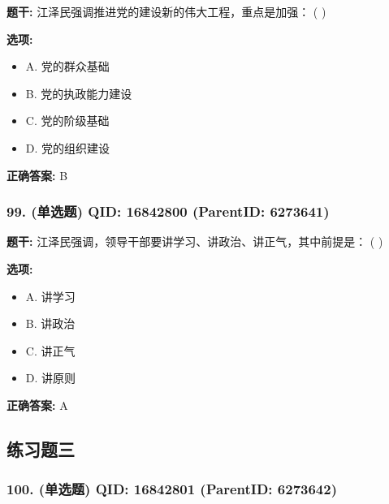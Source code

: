 \documentclass[12pt,UTF8]{ctexart}
\begin{document}
\textbf{题干:}
江泽民强调推进党的建设新的伟大工程，重点是加强： ( )



\textbf{选项:}
\begin{itemize}[leftmargin=*]

  \item A. 党的群众基础

  \item B. 党的执政能力建设

  \item C. 党的阶级基础

  \item D. 党的组织建设

\end{itemize}

\textbf{正确答案:}
B

\vspace{0.3em}\hrulefill\vspace{0.7em}

\subsubsection*{99. (单选题) \small QID: 16842800 (ParentID: 6273641)}

\textbf{题干:}
江泽民强调，领导干部要讲学习、讲政治、讲正气，其中前提是： ( )



\textbf{选项:}
\begin{itemize}[leftmargin=*]

  \item A. 讲学习

  \item B. 讲政治

  \item C. 讲正气

  \item D. 讲原则

\end{itemize}

\textbf{正确答案:}
A

\vspace{0.3em}\hrulefill\vspace{0.7em}

\subsection*{练习题三}

\subsubsection*{100. (单选题) \small QID: 16842801 (ParentID: 6273642)}
\end{document}
